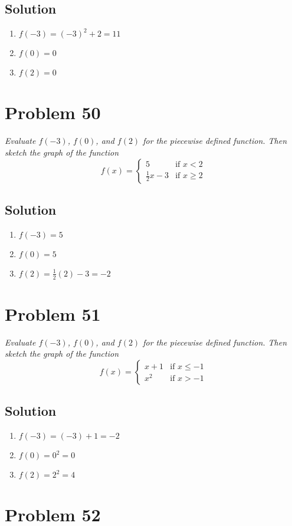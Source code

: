\documentclass[11pt]{article}
\newcommand{\soln}{\subsection*}
\newcommand{\qn}{\textit}
\begin{document}
\soln{Solution}
\begin{enumerate}
	\item $f(-3)=(-3)^2+2=11$
	\item $f(0)=0$
	\item $f(2)=0$
\end{enumerate}

\section*{Problem 50}

\qn{Evaluate $f(-3)$, $f(0)$, and $f(2)$ for the piecewise defined function. Then sketch the graph of the function}
\begin{equation}
	f(x)=
	\begin{cases}
		5 & \text{if } x < 2\\
		\frac{1}{2}x-3 & \text{if } x \ge 2
	\end{cases}
\end{equation}

\soln{Solution}
\begin{enumerate}
	\item $f(-3)=5$
	\item $f(0)=5$
	\item $f(2)=\frac{1}{2}(2)-3=-2$
\end{enumerate}

\section*{Problem 51}

\qn{Evaluate $f(-3)$, $f(0)$, and $f(2)$ for the piecewise defined function. Then sketch the graph of the function}
\begin{equation}
	f(x)=
	\begin{cases}
		x+1 & \text{if } x \le -1\\
		x^2 & \text{if } x > -1
	\end{cases}
\end{equation}

\soln{Solution}
\begin{enumerate}
	\item $f(-3)=(-3)+1=-2$
	\item $f(0)=0^2=0$
	\item $f(2)=2^2=4$
\end{enumerate}

\section*{Problem 52}
\end{document}
